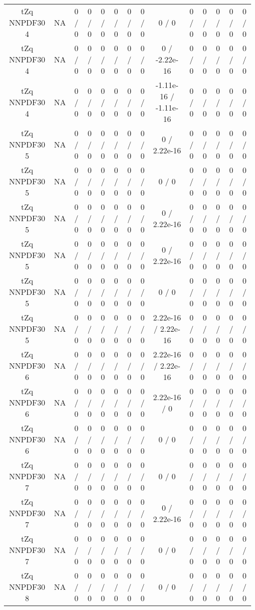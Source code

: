 \documentclass[10pt]{article}
\begin{document}
\begin{table}[htbp]
\begin{center}
\begin{tabular}{|c|c|c|c|c|c|c|c|c|c|c|c|c|c|}
  tZq NNPDF30 4 &    NA    & 0 / 0 & 0 / 0 & 0 / 0 & 0 / 0 & 0 / 0 & 0 / 0 & 0 / 0 & 0 / 0 & 0 / 0 & 0 / 0 & 0 / 0 & 0 / 0 \\ 
  tZq NNPDF30 4 &    NA    & 0 / 0 & 0 / 0 & 0 / 0 & 0 / 0 & 0 / 0 & 0 / 0 & 0 / -2.22e-16 & 0 / 0 & 0 / 0 & 0 / 0 & 0 / 0 & 0 / 0 \\ 
  tZq NNPDF30 4 &    NA    & 0 / 0 & 0 / 0 & 0 / 0 & 0 / 0 & 0 / 0 & 0 / 0 & -1.11e-16 / -1.11e-16 & 0 / 0 & 0 / 0 & 0 / 0 & 0 / 0 & 0 / 0 \\ 
  tZq NNPDF30 5 &    NA    & 0 / 0 & 0 / 0 & 0 / 0 & 0 / 0 & 0 / 0 & 0 / 0 & 0 / 2.22e-16 & 0 / 0 & 0 / 0 & 0 / 0 & 0 / 0 & 0 / 0 \\ 
  tZq NNPDF30 5 &    NA    & 0 / 0 & 0 / 0 & 0 / 0 & 0 / 0 & 0 / 0 & 0 / 0 & 0 / 0 & 0 / 0 & 0 / 0 & 0 / 0 & 0 / 0 & 0 / 0 \\ 
  tZq NNPDF30 5 &    NA    & 0 / 0 & 0 / 0 & 0 / 0 & 0 / 0 & 0 / 0 & 0 / 0 & 0 / 2.22e-16 & 0 / 0 & 0 / 0 & 0 / 0 & 0 / 0 & 0 / 0 \\ 
  tZq NNPDF30 5 &    NA    & 0 / 0 & 0 / 0 & 0 / 0 & 0 / 0 & 0 / 0 & 0 / 0 & 0 / 2.22e-16 & 0 / 0 & 0 / 0 & 0 / 0 & 0 / 0 & 0 / 0 \\ 
  tZq NNPDF30 5 &    NA    & 0 / 0 & 0 / 0 & 0 / 0 & 0 / 0 & 0 / 0 & 0 / 0 & 0 / 0 & 0 / 0 & 0 / 0 & 0 / 0 & 0 / 0 & 0 / 0 \\ 
  tZq NNPDF30 5 &    NA    & 0 / 0 & 0 / 0 & 0 / 0 & 0 / 0 & 0 / 0 & 0 / 0 & 2.22e-16 / 2.22e-16 & 0 / 0 & 0 / 0 & 0 / 0 & 0 / 0 & 0 / 0 \\ 
  tZq NNPDF30 6 &    NA    & 0 / 0 & 0 / 0 & 0 / 0 & 0 / 0 & 0 / 0 & 0 / 0 & 2.22e-16 / 2.22e-16 & 0 / 0 & 0 / 0 & 0 / 0 & 0 / 0 & 0 / 0 \\ 
  tZq NNPDF30 6 &    NA    & 0 / 0 & 0 / 0 & 0 / 0 & 0 / 0 & 0 / 0 & 0 / 0 & 2.22e-16 / 0 & 0 / 0 & 0 / 0 & 0 / 0 & 0 / 0 & 0 / 0 \\ 
  tZq NNPDF30 6 &    NA    & 0 / 0 & 0 / 0 & 0 / 0 & 0 / 0 & 0 / 0 & 0 / 0 & 0 / 0 & 0 / 0 & 0 / 0 & 0 / 0 & 0 / 0 & 0 / 0 \\ 
  tZq NNPDF30 7 &    NA    & 0 / 0 & 0 / 0 & 0 / 0 & 0 / 0 & 0 / 0 & 0 / 0 & 0 / 0 & 0 / 0 & 0 / 0 & 0 / 0 & 0 / 0 & 0 / 0 \\ 
  tZq NNPDF30 7 &    NA    & 0 / 0 & 0 / 0 & 0 / 0 & 0 / 0 & 0 / 0 & 0 / 0 & 0 / 2.22e-16 & 0 / 0 & 0 / 0 & 0 / 0 & 0 / 0 & 0 / 0 \\ 
  tZq NNPDF30 7 &    NA    & 0 / 0 & 0 / 0 & 0 / 0 & 0 / 0 & 0 / 0 & 0 / 0 & 0 / 0 & 0 / 0 & 0 / 0 & 0 / 0 & 0 / 0 & 0 / 0 \\ 
  tZq NNPDF30 8 &    NA    & 0 / 0 & 0 / 0 & 0 / 0 & 0 / 0 & 0 / 0 & 0 / 0 & 0 / 0 & 0 / 0 & 0 / 0 & 0 / 0 & 0 / 0 & 0 / 0 \\ 

\end{tabular}
\end{center}
\end{table}
\end{document}
